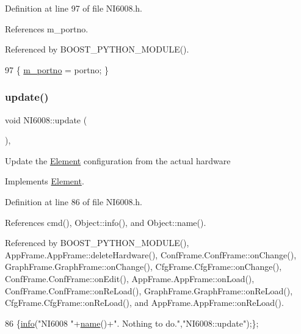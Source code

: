 Definition at line 97 of file N\+I6008.\+h.



References m\+\_\+portno.



Referenced by B\+O\+O\+S\+T\+\_\+\+P\+Y\+T\+H\+O\+N\+\_\+\+M\+O\+D\+U\+L\+E().


\begin{DoxyCode}
97 \{ \hyperlink{classNI6008_aabb914d00c938a12e99c1078f40fb104}{m\_portno} = portno; \}
\end{DoxyCode}
\mbox{\label{classNI6008_a7e04c07277c7bc2b36c197a93edbc278}} 
\subsubsection{\texorpdfstring{update()}{update()}}
{\footnotesize\ttfamily void N\+I6008\+::update (\begin{DoxyParamCaption}{ }\end{DoxyParamCaption})\hspace{0.3cm}{\ttfamily [inline]}, {\ttfamily [virtual]}}

Update the \hyperlink{classElement}{Element} configuration from the actual hardware 

Implements \hyperlink{classElement_a4e6c83efae95616ebddd03c793a26661}{Element}.



Definition at line 86 of file N\+I6008.\+h.



References cmd(), Object\+::info(), and Object\+::name().



Referenced by B\+O\+O\+S\+T\+\_\+\+P\+Y\+T\+H\+O\+N\+\_\+\+M\+O\+D\+U\+L\+E(), App\+Frame.\+App\+Frame\+::delete\+Hardware(), Conf\+Frame.\+Conf\+Frame\+::on\+Change(), Graph\+Frame.\+Graph\+Frame\+::on\+Change(), Cfg\+Frame.\+Cfg\+Frame\+::on\+Change(), Conf\+Frame.\+Conf\+Frame\+::on\+Edit(), App\+Frame.\+App\+Frame\+::on\+Load(), Conf\+Frame.\+Conf\+Frame\+::on\+Re\+Load(), Graph\+Frame.\+Graph\+Frame\+::on\+Re\+Load(), Cfg\+Frame.\+Cfg\+Frame\+::on\+Re\+Load(), and App\+Frame.\+App\+Frame\+::on\+Re\+Load().


\begin{DoxyCode}
86 \{\hyperlink{classObject_a644fd329ea4cb85f54fa6846484b84a8}{info}(\textcolor{stringliteral}{"NI6008 "}+\hyperlink{classObject_a300f4c05dd468c7bb8b3c968868443c1}{name}()+\textcolor{stringliteral}{". Nothing to do."},\textcolor{stringliteral}{"NI6008::update"});\};
\end{DoxyCode}


